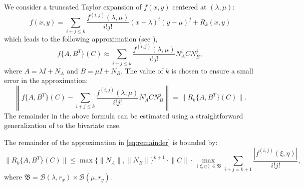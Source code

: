\documentclass{siamart1116}
\newcommand{\norm}[1]{\lVert#1\rVert}
\begin{document}
We consider a
truncated Taylor expansion of $f(x,y)$ centered 
at $(\lambda, \mu)$:
\[
  f(x,y) = \sum_{i+j \leq k}
    \frac{f^{(i,j)}(\lambda, \mu)}{i!j!} 
    (x - \lambda)^i 
    (y - \mu)^j + R_{k}(x, y)
\]
which leads to the following approximation (see \cite[Section 2.2]{kressner2011bivariate}), 
\begin{equation}\label{eq:taylor-approx}
  f\{A,B^T\}(C) \approx \sum_{i+j\leq k} 
    \frac{f^{(i,j)}(\lambda, \mu)}{i!j!}
    N_A^i C N_B^j, %
\end{equation}
where $A = \lambda I + N_A$ and $B = \mu I + N_B$. The value of 
$k$ is chosen to ensure a small error in the approximation:
\begin{equation} \label{eq:remainder}
  \left \lVert
    f\{A,B^T\}(C) - \sum_{i+j\leq k} \frac{f^{(i,j)}(\lambda, \mu)}{i!j!}N_A^i C N_B^j
  \right \rVert = \norm{R_{k}\{ A, B^T \}(C)}.
\end{equation}
The remainder in the above formula can be estimated using a straightforward
generalization of \cite[Theorem~2.5]{davies2003schur} to the 
bivariate case.
\begin{lemma}
  The remainder of the approximation in \eqref{eq:remainder}
  is bounded by:
  \[
    \norm{R_{k}\{ A, B^T \}(C)} \leq 
      \max \{ \norm{N_A},  \norm{N_B} \}^{k+1}
      \cdot \norm{C} \cdot 
      \max_{(\xi, \eta) \in \mathfrak B}
        \sum_{i+j=k+1} \frac{|f^{(i,j)}(\xi, \eta)|}{i!j!},
  \]
  where $\mathfrak B = \mathcal B(\lambda, r_x)
  \times \mathcal B(\mu, r_y)$. 
\end{lemma}
\end{document}
